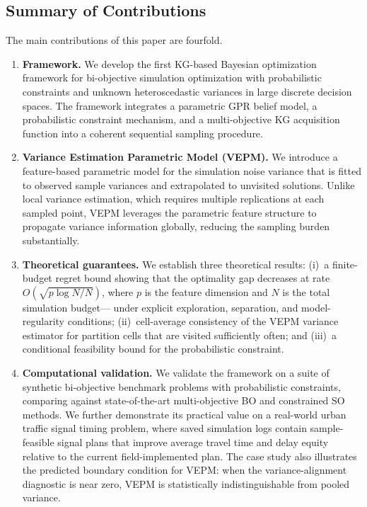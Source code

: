 \documentclass[12pt]{article}
\theoremstyle{plain}
\theoremstyle{definition}
\theoremstyle{remark}
\begin{document}
\subsection{Summary of Contributions}\label{sec:contributions}

The main contributions of this paper are fourfold.

\begin{enumerate}[label=\textbf{C\arabic*.},leftmargin=2em]
\item \textbf{Framework.}
  We develop the first KG-based Bayesian optimization framework for
  bi-objective simulation optimization with probabilistic constraints
  and unknown heteroscedastic variances in large discrete decision
  spaces.  The framework integrates a parametric GPR belief model, a
  probabilistic constraint mechanism, and a multi-objective KG
  acquisition function into a coherent sequential sampling procedure.

\item \textbf{Variance Estimation Parametric Model (VEPM).}
  We introduce a feature-based parametric model for the simulation
  noise variance that is fitted to observed sample variances and
  extrapolated to unvisited solutions.  Unlike local variance
  estimation, which requires multiple replications at each sampled
  point, VEPM leverages the parametric feature structure to propagate
  variance information globally, reducing the sampling burden
  substantially.

\item \textbf{Theoretical guarantees.}
  We establish three theoretical results:
  (i)~a finite-budget regret bound showing that the optimality gap
  decreases at rate $O\!\left(\sqrt{p\log N/N}\right)$, where $p$ is
  the feature dimension and $N$ is the total simulation budget---
  under explicit exploration, separation, and model-regularity
  conditions; (ii)~cell-average consistency of the VEPM variance
  estimator for partition cells that are visited sufficiently often;
  and (iii)~a conditional feasibility bound for the probabilistic
  constraint.

\item \textbf{Computational validation.}
  We validate the framework on a suite of synthetic bi-objective
  benchmark problems with probabilistic constraints, comparing against
  state-of-the-art multi-objective BO and constrained SO methods.  We
  further demonstrate its practical value on a real-world urban
  traffic signal timing problem, where saved simulation logs contain
  sample-feasible signal plans that improve average travel time and
  delay equity relative to the current field-implemented plan.
  The case study also illustrates the predicted boundary condition for
  VEPM: when the variance-alignment diagnostic is near zero, VEPM is
  statistically indistinguishable from pooled variance.
\end{enumerate}
\end{document}
